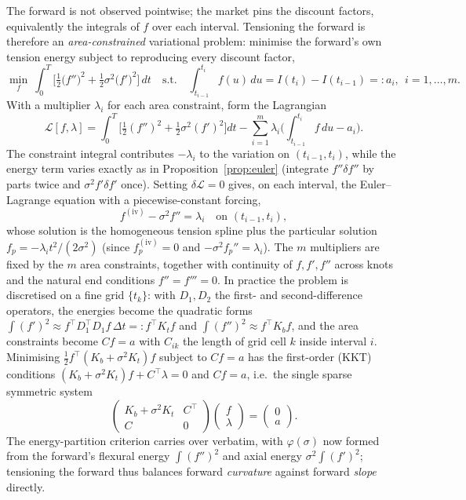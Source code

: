 \documentclass[10pt]{article}
\begin{document}
The forward is not observed pointwise; the market pins the discount factors, equivalently the
integrals of $f$ over each interval. Tensioning the forward is therefore an \emph{area-constrained}
variational problem: minimise the forward's own tension energy subject to reproducing every
discount factor,
\begin{equation}
\min_{f}\ \int_{0}^{T}\!\Big[\tfrac12\big(f''\big)^2+\tfrac12\sigma^2\big(f'\big)^2\Big]\,dt
\quad\text{s.t.}\quad
\int_{t_{i-1}}^{t_i} f(u)\,du = I(t_i)-I(t_{i-1})=:a_i,\ \ i=1,\dots,m.
\label{eq:fwdmin}
\end{equation}
With a multiplier $\lambda_i$ for each area constraint, form the Lagrangian
\[
\mathcal{L}[f,\lambda]=\int_0^T\!\Big[\tfrac12(f'')^2+\tfrac12\sigma^2(f')^2\Big]dt
-\sum_{i=1}^m\lambda_i\Big(\int_{t_{i-1}}^{t_i}\!f\,du-a_i\Big).
\]
The constraint integral contributes $-\lambda_i$ to the variation on $(t_{i-1},t_i)$, while the
energy term varies exactly as in Proposition~\ref{prop:euler} (integrate $f''\delta f''$ by parts
twice and $\sigma^2 f'\delta f'$ once). Setting $\delta\mathcal{L}=0$ gives, on each interval, the
Euler--Lagrange equation with a piecewise-constant forcing,
\begin{equation}
f^{(\mathrm{iv})}-\sigma^2 f''=\lambda_i \quad\text{on } (t_{i-1},t_i),
\end{equation}
whose solution is the homogeneous tension spline plus the particular solution
$f_p=-\lambda_i t^2/(2\sigma^2)$ (since $f_p^{(\mathrm{iv})}=0$ and $-\sigma^2 f_p''=\lambda_i$).
The $m$ multipliers are fixed by the $m$ area constraints, together with continuity of
$f,f',f''$ across knots and the natural end conditions $f''=f'''=0$. In practice the problem is
discretised on a fine grid $\{t_k\}$: with $D_1,D_2$ the first- and second-difference operators,
the energies become the quadratic forms $\int(f')^2\approx f^{\!\top}\!D_1^{\!\top}D_1 f\,\Delta t=:f^{\!\top}\!K_t f$
and $\int(f'')^2\approx f^{\!\top}\!K_b f$, and the area constraints become $Cf=a$ with $C_{ik}$ the
length of grid cell $k$ inside interval $i$. Minimising $\tfrac12 f^{\!\top}(K_b+\sigma^2K_t)f$
subject to $Cf=a$ has the first-order (KKT) conditions $(K_b+\sigma^2K_t)f+C^{\!\top}\lambda=0$ and
$Cf=a$, i.e.\ the single sparse symmetric system
\begin{equation}
\begin{pmatrix} K_b+\sigma^2 K_t & C^{\!\top}\\ C & 0\end{pmatrix}
\begin{pmatrix} f\\ \lambda\end{pmatrix}=\begin{pmatrix}0\\ a\end{pmatrix}.
\end{equation}
The energy-partition criterion carries over verbatim, with $\varphi(\sigma)$ now formed from
the forward's flexural energy $\int(f'')^2$ and axial energy $\sigma^2\int(f')^2$; tensioning
the forward thus balances forward \emph{curvature} against forward \emph{slope} directly.
\end{document}
